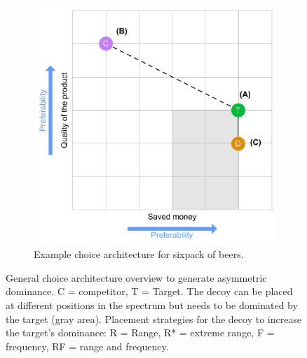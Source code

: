 \begin{figure}[!htbp]
\begin{subfigure}[t]{0.49\textwidth}
	\end{subfigure}
	\begin{subfigure}[t]{0.49\textwidth}
		\includegraphics[width=\textwidth]{figures/decoy/decoy-dimensions-beer}
		\caption{Example choice architecture for sixpack of beers.}
		\label{fig:decoy:beer-construction} 
	\end{subfigure}
	\caption{
		General choice architecture overview to generate asymmetric dominance. 
		C = competitor, T = Target. The decoy can be placed at different positions in the spectrum but needs to be dominated by the target (gray area). Placement strategies for the decoy to increase the target's dominance: R = Range, R* = extreme range, F = frequency, RF = range and frequency.
	} 
\end{figure}


